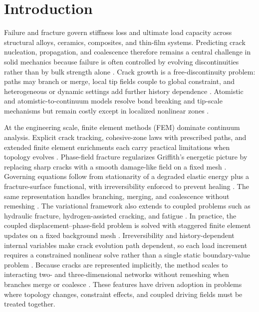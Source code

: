 \documentclass[10pt]{article}
\theoremstyle{definition}
\begin{document}
\clearpage

\section{Introduction}\label{sec:introduction}

Failure and fracture govern stiffness loss and ultimate load capacity across structural alloys, ceramics, composites, and thin-film systems.
%
Predicting crack nucleation, propagation, and coalescence therefore remains a central challenge in solid mechanics because failure is often controlled by evolving discontinuities rather than by bulk strength alone \cite{griffith1921,irwin1957,rice1968,dugdale1960,barenblatt1962}.
%
Crack growth is a free-discontinuity problem: paths may branch or merge, local tip fields couple to global constraint, and heterogeneous or dynamic settings add further history dependence \cite{rice1968,spatschek2011,bouchbinder2014}.
%
Atomistic and atomistic-to-continuum models resolve bond breaking and tip-scale mechanisms but remain costly except in localized nonlinear zones \cite{buehler2006,tadmor1996,shenoy1999}.

At the engineering scale, finite element methods (FEM) dominate continuum analysis.
%
Explicit crack tracking, cohesive-zone laws with prescribed paths, and extended finite element enrichments each carry practical limitations when topology evolves \cite{xu1994,moes1999}.
%
Phase-field fracture regularizes Griffith's energetic picture by replacing sharp cracks with a smooth damage-like field on a fixed mesh \cite{francfort1998,bourdin2000,bourdin2008}.
%
Governing equations follow from stationarity of a degraded elastic energy plus a fracture-surface functional, with irreversibility enforced to prevent healing \cite{bourdin2007,miehe2010a,miehe2010b}.
%
The same representation handles branching, merging, and coalescence without remeshing \cite{karma2004,spatschek2011,miehe2010a,ambati2015}.
%
The variational framework also extends to coupled problems such as hydraulic fracture, hydrogen-assisted cracking, and fatigue \cite{lee2017,martinez2018,carrara2019fatigue}.
%
In practice, the coupled displacement--phase-field problem is solved with staggered finite element updates on a fixed background mesh \cite{miehe2010a,miehe2010b}.
%
Irreversibility and history-dependent internal variables make crack evolution path dependent, so each load increment requires a constrained nonlinear solve rather than a single static boundary-value problem \cite{gerasimov2019,miehe2010a}.
%
Because cracks are represented implicitly, the method scales to interacting two- and three-dimensional networks without remeshing when branches merge or coalesce \cite{karma2004,ambati2015}.
%
These features have driven adoption in problems where topology changes, constraint effects, and coupled driving fields must be treated together.
\end{document}
